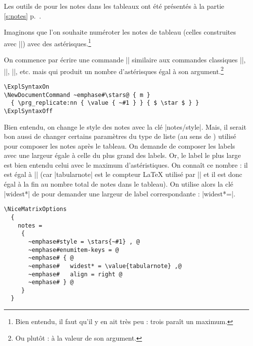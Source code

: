 \documentclass[dvipsnames]{article}%
\begin{document}
Les outils de  pour les notes dans les tableaux ont été
présentés à la partie \ref{s:notes} p.~\pageref{s:notes}.

\bigskip
Imaginons que l'on souhaite numéroter les notes de tableau (celles construites
avec |\tabularnote|) avec des astérisques.\footnote{Bien entendu, il faut qu'il
  y en ait très peu : trois paraît un maximum.}

On commence par écrire une commande |\stars| similaire aux commandes classiques
|\arabic|, |\alph|, |\Alph|, etc. mais qui produit un nombre d'astérisques égal
à son argument.\footnote{Ou plutôt : à la valeur de son argument.}
\begin{Verbatim}
\ExplSyntaxOn
\NewDocumentCommand ~emphase#\stars@ { m }
  { \prg_replicate:nn { \value { ~#1 } } { $ \star $ } } 
\ExplSyntaxOff
\end{Verbatim}
%
Bien entendu, on change le style des notes avec la clé |notes/style|. Mais, il
serait bon aussi de changer certains paramètres du type de liste (au sens de
) utilisé pour composer les notes après le tableau. On demande de
composer les labels avec une largeur égale à celle du plus grand des labels. Or,
le label le plus large est bien entendu celui avec le maximum d'astéristiques.
On connaît ce nombre : il est égal à |\value{tabularnote}| (car |tabularnote|
est le compteur LaTeX utilisé par |\tabularnote| et il est donc égal à la fin au
nombre total de notes dans le tableau). On utilise alors la clé |widest*| de 
 pour demander une largeur de label correspondante :
|widest*=\value{tabularnote}|. 
\begin{Verbatim}
\NiceMatrixOptions 
  {
    notes = 
     {
       ~emphase#style = \stars{~#1} , @
       ~emphase#enumitem-keys = @
       ~emphase# { @
       ~emphase#   widest* = \value{tabularnote} ,@
       ~emphase#   align = right @
       ~emphase# } @
     }
  }
\end{Verbatim}
\end{document}
